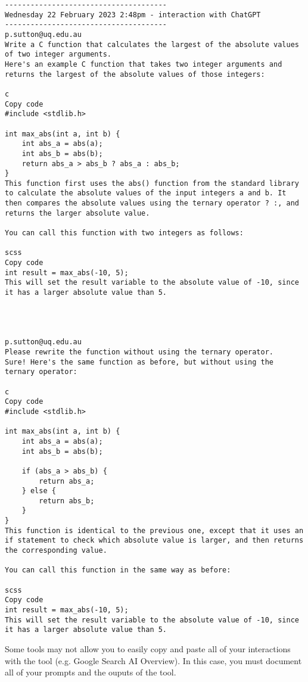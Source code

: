 \documentclass{article}
\begin{document}
\nolinenumbers
{}
\begin{lstlisting}
--------------------------------------
Wednesday 22 February 2023 2:48pm - interaction with ChatGPT
--------------------------------------
p.sutton@uq.edu.au
Write a C function that calculates the largest of the absolute values of two integer arguments.
Here's an example C function that takes two integer arguments and returns the largest of the absolute values of those integers:

c
Copy code
#include <stdlib.h>

int max_abs(int a, int b) {
    int abs_a = abs(a);
    int abs_b = abs(b);
    return abs_a > abs_b ? abs_a : abs_b;
}
This function first uses the abs() function from the standard library to calculate the absolute values of the input integers a and b. It then compares the absolute values using the ternary operator ? :, and returns the larger absolute value.

You can call this function with two integers as follows:

scss
Copy code
int result = max_abs(-10, 5);
This will set the result variable to the absolute value of -10, since it has a larger absolute value than 5.




p.sutton@uq.edu.au
Please rewrite the function without using the ternary operator.
Sure! Here's the same function as before, but without using the ternary operator:

c
Copy code
#include <stdlib.h>

int max_abs(int a, int b) {
    int abs_a = abs(a);
    int abs_b = abs(b);
    
    if (abs_a > abs_b) {
        return abs_a;
    } else {
        return abs_b;
    }
}
This function is identical to the previous one, except that it uses an if statement to check which absolute value is larger, and then returns the corresponding value.

You can call this function in the same way as before:

scss
Copy code
int result = max_abs(-10, 5);
This will set the result variable to the absolute value of -10, since it has a larger absolute value than 5.
\end{lstlisting}
\linenumbers

\noindent Some tools may not allow you to easily copy and paste all of your interactions with the tool (e.g. Google Search AI Overview). In this case, you must document all of your prompts and the ouputs of the tool.
\end{document}
